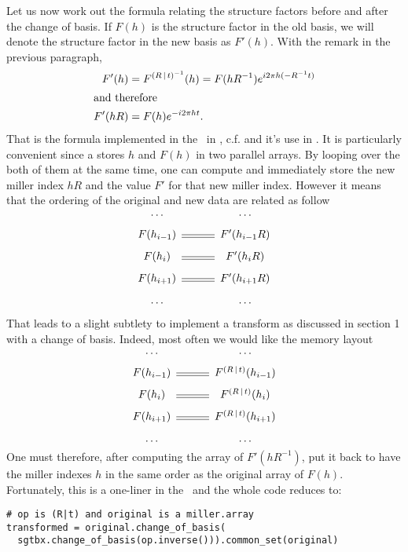 \documentclass[11pt]{article}
\begin{document}
Let us now work out the formula relating the structure factors before and after the change of basis. If $F(h)$ is the structure factor in the old basis, we will denote the structure factor in the new basis as $F'(h)$. With the remark in the previous paragraph,
\begin{align}
F'(h) &= F^{\left( R\,\vert\, t \right)^{-1}}(h) = F(hR^{-1}) e^{i2\pi h(-R^{-1}t)}\nonumber\\
\intertext{and therefore}
F'(hR) &= F(h)e^{-i2\pi ht}. \label{change::basis::F}
\end{align}
That is the formula implemented in the \cctbx\ in , c.f.  and it's use in . It is particularly convenient since a  stores $h$ and $F(h)$ in two parallel arrays. By looping over the both of them at the same time, one can compute and immediately store the new miller index $hR$ and the value $F'$ for that new miller index. However it means that the ordering of the original and new data are related as follow
\begin{equation}
\begin{CD}
\ldots @. \ldots\\
F(h_{i-1}) @= F'(h_{i-1}R)\\
F(h_i) @= F'(h_iR)\\
F(h_{i+1}) @= F'(h_{i+1}R)\\
\ldots @. \ldots
\end{CD}
\label{miller::array::change::basis}
\end{equation}

That leads to a slight subtlety to implement a transform as discussed in section 1 with a change of basis. Indeed, most often we would like the memory layout
\begin{equation}
\begin{CD}
\ldots @. \ldots\\
F(h_{i-1}) @= F^{\sym{R}{t}}(h_{i-1})\\
F(h_i) @= F^{\sym{R}{t}}(h_i)\\
F(h_{i+1}) @= F^{\sym{R}{t}}(h_{i+1})\\
\ldots @. \ldots
\end{CD}
\label{miller::array::transform}
\end{equation}
One must therefore, after computing the array of $F'(hR^{-1})$, put it back to have the miller indexes $h$ in the same order as the original array of $F(h)$. Fortunately, this is a one-liner in the \cctbx\ and the whole code reduces to:
\begin{verbatim}
# op is (R|t) and original is a miller.array
transformed = original.change_of_basis(
  sgtbx.change_of_basis(op.inverse())).common_set(original)
\end{verbatim}
\end{document}
